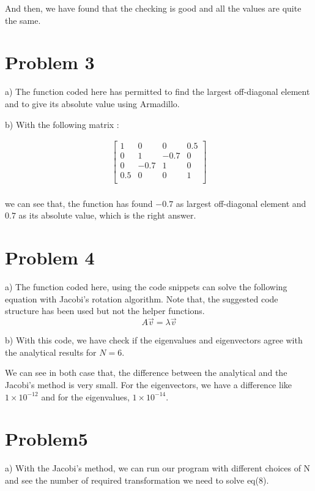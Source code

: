 \documentclass[english,notitlepage]{revtex4-1}
\begin{document}
And then, we have found that the checking is good and all the values are quite the same.

\bigbreak
\section{Problem 3}
a) The function coded here has permitted to find the largest off-diagonal element and to give its absolute value using Armadillo.

b) With the following matrix :

\begin{gather}
\begin{bmatrix}
    1 & 0 & 0 & 0.5\\
    0 & 1 & -0.7 & 0\\
    0 & -0.7 & 1 & 0\\
    0.5 & 0 & 0 & 1\\
\end{bmatrix}
\end{gather}\\
we can see that, the function has found $-0.7$ as largest off-diagonal element and $0.7$ as its absolute value, which is the right answer.

\bigbreak
\section{Problem 4}
a) The function coded here, using the code snippets can solve the following equation with Jacobi's rotation algorithm. Note that, the suggested code structure has been used but not the helper functions.
\begin{equation}
    A\overrightarrow{v}=\lambda\overrightarrow{v}
\end{equation}

b) With this code, we have check if the eigenvalues and eigenvectors agree with the analytical results for $N=6$.

We can see in both case that, the difference between the analytical and the Jacobi's method is very small. For the eigenvectors, we have a difference like $1\times10^{-12}$ and for the eigenvalues, $1\times10^{-14}$.

\bigbreak
\section{Problem5}
a) With the Jacobi's method, we can run our program with different choices of N and see the number of required transformation we need to solve eq(8).
\end{document}

